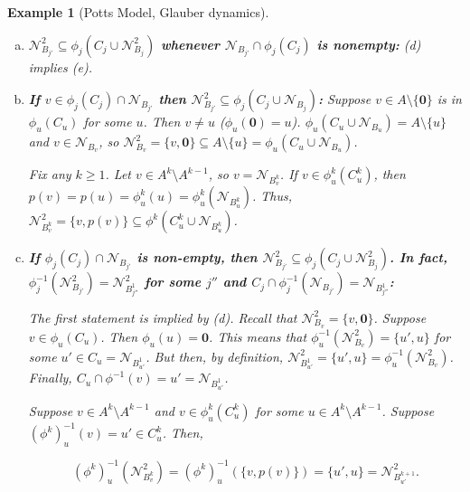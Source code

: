 \documentclass[12pt]{article}
\newcommand{\mc}{\mathcal}
\newcommand{\tr}{\textcolor{red}}
\newcommand{\ind}{\hspace{24pt}}
\newcommand{\neigh}[1]{\mc{N}_{#1}}				%
\newcommand{\dneigh}[1]{\mc{N}^2_{#1}}			%
\renewcommand{\root}{\mathbf{0}}					%
\newcommand{\indx}[1]{^{#1}}						%
\newtheorem{example}[thms]{Example}
\begin{document}
\begin{example}[Potts Model, Glauber dynamics]
\begin{description}
\begin{enumerate}[(a)]
\ind \tr{This is kind of complicated. I would recommend walking through the argument while looking at figures 3 and 4}

\ind Thus, \(\dneigh{B\indx{k}_v}\cap\phi\indx{k}_u(C\indx{k}_u\cup\dneigh{B\indx{k}_u}) \in \{\emptyset, \dneigh{B\indx{k}_v}\}\).

\item {\bfseries\boldmath\(\dneigh{B_{j'}}\subseteq\phi_j(C_j\cup\dneigh{B_j})\) whenever \(\neigh{B_{j'}}\cap\phi_j(C_j)\) is nonempty:} (d) implies (e).

\item {\bfseries\boldmath If \(v\in \phi_j(C_j)\cap\neigh{B_{j'}}\) then \(\dneigh{B_{j'}}\subseteq \phi_j(C_j\cup\neigh{B_j})\):} Suppose \(v \in A\setminus \{\root\}\) is in \(\phi_u(C_u)\) for some \(u\). Then \(v \neq u\) (\(\phi_u(\root) = u\)). \(\phi_u(C_u\cup\neigh{B_u}) = A\setminus \{u\}\) and \(v \in \neigh{B_v}\), so \(\dneigh{B_v} = \{v,\root\} \subseteq A\setminus \{u\} = \phi_u(C_u\cup\neigh{B_u})\).

\ind Fix any \(k \geq 1\). Let \(v \in A\indx{k}\setminus A\indx{k-1}\), so \(v = \neigh{B\indx{k}_v}\). If \(v \in \phi\indx{k}_u(C\indx{k}_u)\), then \(p(v) = p(u) = \phi\indx{k}_u(u) = \phi\indx{k}_u(\neigh{B\indx{k}_u})\). Thus, \(\dneigh{B\indx{k}_v} = \{v,p(v)\} \subseteq \phi\indx{k}(C\indx{k}_u\cup\neigh{B\indx{k}_u})\).

\item {\bfseries\boldmath If \(\phi_j(C_j)\cap\neigh{B_{j'}}\) is non-empty, then \(\dneigh{B_{j'}} \subseteq \phi_j(C_j\cup\dneigh{B_j})\). In fact, \(\phi_j^{-1}(\dneigh{B_{j'}}) = \dneigh{B\indx{1}_{j''}}\) for some \(j''\) and \(C_j\cap\phi_j^{-1}(\neigh{B_{j'}}) = \neigh{B\indx{1}_{j''}}\):}

The first statement is implied by (d). Recall that \(\dneigh{B_v} = \{v,\root\}\). Suppose \(v \in \phi_u(C_u)\). Then \(\phi_u(u) = \root\). This means that \(\phi^{-1}_u(\dneigh{B_v}) = \{u',u\}\) for some \(u' \in C_u = \neigh{B\indx{1}_{u'}}\). But then, by definition, \(\dneigh{B\indx{1}_{u'}} = \{u',u\} = \phi^{-1}_u(\dneigh{B_v})\). Finally, \(C_u \cap \phi^{-1}(v) = u' = \neigh{B\indx{1}_{u'}}\).

\ind Suppose \(v \in A\indx{k}\setminus A\indx{k-1}\) and \(v \in \phi\indx{k}_u(C\indx{k}_u)\) for some \(u \in A\indx{k}\setminus A\indx{k-1}\). Suppose \((\phi\indx{k})^{-1}_u(v) = u' \in C\indx{k}_u\). Then,

\[(\phi\indx{k})^{-1}_u(\dneigh{B\indx{k}_v}) = (\phi\indx{k})^{-1}_u(\{v,p(v)\}) = \{u',u\} = \dneigh{B\indx{k+1}_{u'}}.\]


\end{enumerate}
\end{description}
\end{example}
\end{document}
